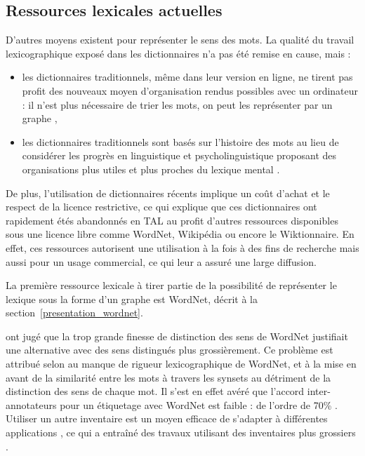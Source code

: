 \subsection{Ressources lexicales actuelles}
\label{subsec:ressources_lexicales}

D'autres moyens existent pour représenter le sens des mots. La qualité du
travail lexicographique exposé dans les dictionnaires n'a pas été remise en
cause, mais :

\begin{itemize}

    \item les dictionnaires traditionnels, même dans leur version en ligne, ne
        tirent pas profit des nouveaux moyen d'organisation rendus possibles
        avec un ordinateur : il n'est plus nécessaire de trier les mots, on
        peut les représenter par un graphe
        \citep{miller1990introduction,polguere2013tissage},

    \item les dictionnaires traditionnels sont basés sur l'histoire des mots au
        lieu de considérer les progrès en linguistique et psycholinguistique
        proposant des organisations plus utiles et plus proches du lexique
        mental \citep{miller1990introduction}.

\end{itemize}

De plus, l'utilisation de dictionnaires récents implique un coût d'achat et le
respect de la licence restrictive, ce qui explique que ces dictionnaires ont
rapidement étés abandonnés en TAL au profit d'autres ressources disponibles
sous une licence libre comme WordNet, Wikipédia ou encore le Wiktionnaire. En
effet, ces ressources autorisent une utilisation à la fois à des fins de
recherche mais aussi pour un usage commercial, ce qui leur a assuré une large
diffusion.

La première ressource lexicale à tirer partie de la possibilité de représenter
le lexique sous la forme d'un graphe est WordNet, décrit à la
section~\ref{presentation_wordnet}.

\citep{hovy2006ontonotes,ide2006making,navigli2007semeval,snow2007learning} ont
jugé que la trop grande finesse de distinction des sens de WordNet justifiait
une alternative avec des sens distingués plus grossièrement. Ce problème est
attribué selon \cite{edmonds2002introduction} au manque de rigueur
lexicographique de WordNet, et à la mise en avant de la similarité entre les
mots à travers les synsets au détriment de la distinction des sens de chaque
mot. Il s'est en effet avéré que l'accord inter-annotateurs pour un étiquetage
avec WordNet est faible : de l'ordre de 70\% \citep{snyder2004english}.
Utiliser un autre inventaire est un moyen efficace de s'adapter à différentes
applications \citep{palmer2004different}, ce qui a entraîné des travaux
utilisant des inventaires plus grossiers \citep{navigli2007semeval}.

